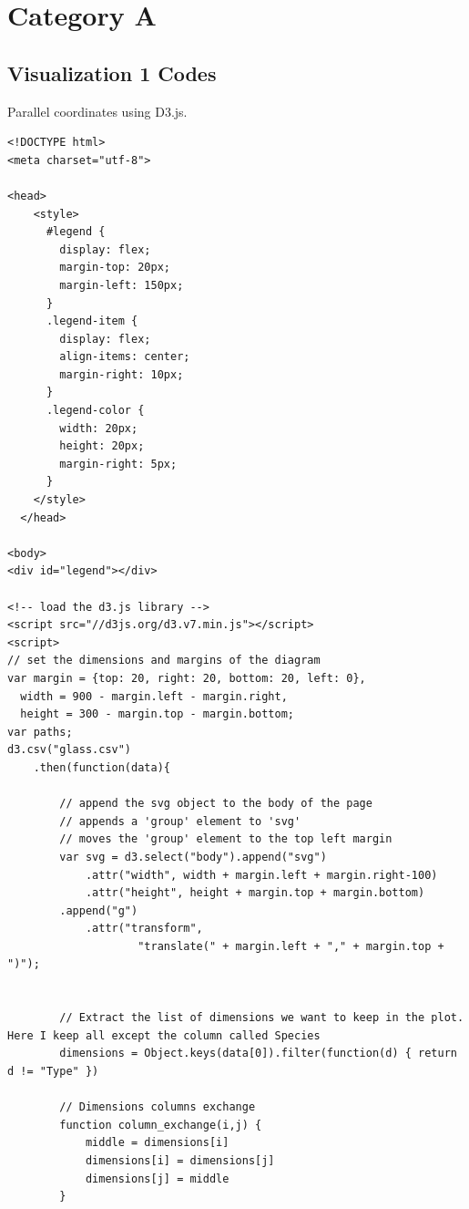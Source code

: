 \documentclass{article}
\begin{document}
\newpage

\appendix

\section{Category A}

\subsection{Visualization 1 Codes}

Parallel coordinates using D3.js.\cite{legend}

\begin{lstlisting}
<!DOCTYPE html>
<meta charset="utf-8">

<head>
    <style>
      #legend {
        display: flex;
        margin-top: 20px;
        margin-left: 150px;
      }
      .legend-item {
        display: flex;
        align-items: center;
        margin-right: 10px;
      }
      .legend-color {
        width: 20px;
        height: 20px;
        margin-right: 5px;
      }
    </style>
  </head>

<body>
<div id="legend"></div>

<!-- load the d3.js library -->    	
<script src="//d3js.org/d3.v7.min.js"></script>
<script>
// set the dimensions and margins of the diagram
var margin = {top: 20, right: 20, bottom: 20, left: 0},
  width = 900 - margin.left - margin.right,
  height = 300 - margin.top - margin.bottom;
var paths;
d3.csv("glass.csv")
    .then(function(data){
        
        // append the svg object to the body of the page
        // appends a 'group' element to 'svg'
        // moves the 'group' element to the top left margin
        var svg = d3.select("body").append("svg")
            .attr("width", width + margin.left + margin.right-100)
            .attr("height", height + margin.top + margin.bottom)
        .append("g")
            .attr("transform",
                    "translate(" + margin.left + "," + margin.top + ")");
        
        
        // Extract the list of dimensions we want to keep in the plot. Here I keep all except the column called Species
        dimensions = Object.keys(data[0]).filter(function(d) { return d != "Type" })

        // Dimensions columns exchange
        function column_exchange(i,j) {
            middle = dimensions[i]
            dimensions[i] = dimensions[j]
            dimensions[j] = middle
        }


\end{lstlisting}
\end{document}
